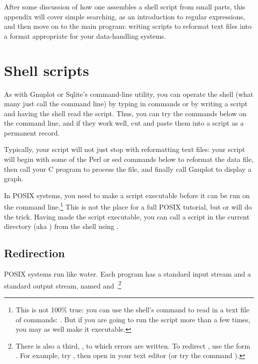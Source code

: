 After some discussion of how one assembles a shell script from small
parts, this appendix will cover simple searching, as an introduction to
regular expressions, and then move on to the main program: writing
scripts to reformat text files into a format appropriate for your
data-handling systems.

\section{Shell scripts} As with Gnuplot or Sqlite's command-line
utility, you can operate the shell (what many just call the command line)
by typing in commands or by writing a script and having the shell read
the script. Thus, you can try the commands below on the command line,
and if they work well, cut and paste them into a script as a permanent
record. 

Typically, your script will not just stop with reformatting text files:
your script will begin with some of the Perl or sed commands below to
reformat the data file, then call your C program to process the file, and
finally call Gnuplot to display a graph. 

In POSIX systems, you need to make a script executable before it can be
run on the command line.\footnote{This is not 100\% true: you can use
the shell's  command to read in a text file of commands:
. But if you are going to run the script more than a
few times, you may as well make it executable.} This is not the place
for a full POSIX tutorial, but  or  will do the trick. Having made the script executable, you
can call a script in the current directory (aka ) from the shell
using .

\subsection{Redirection} 
POSIX systems run like water. Each program has a standard input stream
and a standard output stream, named  and
.\footnote{There is also a third, , to which
errors are written. To redirect , use the form \ci{\&>}. For
example, try , then open  in your text editor
(or try the command ).}

